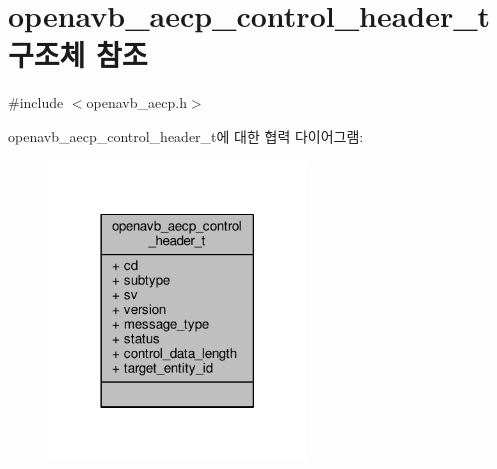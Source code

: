 \hypertarget{structopenavb__aecp__control__header__t}{}\section{openavb\+\_\+aecp\+\_\+control\+\_\+header\+\_\+t 구조체 참조}
\label{structopenavb__aecp__control__header__t}


{\ttfamily \#include $<$openavb\+\_\+aecp.\+h$>$}



openavb\+\_\+aecp\+\_\+control\+\_\+header\+\_\+t에 대한 협력 다이어그램\+:
\nopagebreak
\begin{figure}[H]
\begin{center}
\leavevmode
\includegraphics[width=194pt]{structopenavb__aecp__control__header__t__coll__graph}
\end{center}
\end{figure}
